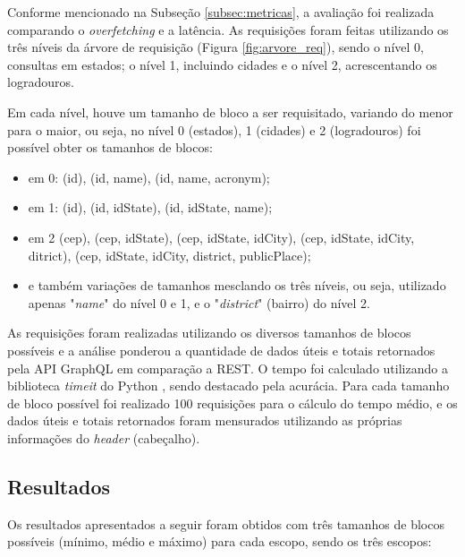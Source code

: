 \documentclass[conference]{IEEEtran}
\begin{document}
Conforme mencionado na Subseção \ref{subsec:metricas}, a avaliação foi realizada comparando o \textit{overfetching} e a latência. As requisições foram feitas utilizando os três níveis da árvore de requisição (Figura \ref{fig:arvore_req}), sendo o nível 0, consultas em estados; o nível 1, incluindo cidades e o nível 2, acrescentando os logradouros.

Em cada nível, houve um tamanho de bloco a ser requisitado, variando do menor para o maior, ou seja, no nível 0 (estados), 1 (cidades) e 2 (logradouros) foi possível obter os tamanhos de blocos:

\begin{itemize}
    \item em 0: (id), (id, name), (id, name, acronym);
    \item em 1: (id), (id, idState), (id, idState, name);
    \item em 2 (cep), (cep, idState), (cep, idState, idCity), (cep, idState, idCity, ditrict), (cep, idState, idCity, district, publicPlace);
    \item e também variações de tamanhos mesclando os três níveis, ou seja, utilizado apenas "\textit{name}" do nível 0 e 1, e o "\textit{district}" (bairro) do nível 2.
\end{itemize}

As requisições foram realizadas utilizando os diversos tamanhos de blocos possíveis e a análise ponderou a quantidade de dados úteis e totais retornados pela API GraphQL em comparação a REST. O tempo foi calculado utilizando a biblioteca \textit{timeit} do Python \cite{Python:2019}, sendo destacado pela acurácia. Para cada tamanho de bloco possível foi realizado 100 requisições para o cálculo do tempo médio, e os dados úteis e totais retornados foram mensurados utilizando as próprias informações do \textit{header} (cabeçalho).

\subsection{Resultados}

Os resultados apresentados a seguir foram obtidos com três tamanhos de blocos possíveis (mínimo, médio e máximo) para cada escopo, sendo os três escopos:
\end{document}
